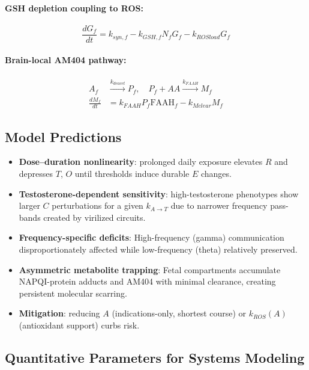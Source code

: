 \documentclass[11pt]{article}
\let\oldsubsection\subsection
\renewcommand{\subsection}[1]{\oldsubsection{#1}\setlength{\leftskip}{0.75em}}
\begin{document}
\paragraph{GSH depletion coupling to ROS:}
\begin{equation}
\frac{dG_f}{dt} = k_{syn,f} - k_{GSH,f} N_f G_f - k_{ROS load} G_f
\end{equation}

\paragraph{Brain-local AM404 pathway:}
\begin{align}
A_f &\xrightarrow{k_{deacet}} P_f, \quad P_f + AA \xrightarrow{k_{FAAH}} M_f \\
\frac{dM_f}{dt} &= k_{FAAH} P_f \text{FAAH}_f - k_{M clear} M_f
\end{align}

\subsection{Model Predictions}
\begin{itemize}
\item \textbf{Dose--duration nonlinearity}: prolonged daily exposure elevates $R$ and depresses $T$, $O$ until thresholds induce durable $E$ changes.
\item \textbf{Testosterone-dependent sensitivity}: high-testosterone phenotypes show larger $C$ perturbations for a given $k_{A \rightarrow T}$ due to narrower frequency pass-bands created by virilized circuits.
\item \textbf{Frequency-specific deficits}: High-frequency (gamma) communication disproportionately affected while low-frequency (theta) relatively preserved.
\item \textbf{Asymmetric metabolite trapping}: Fetal compartments accumulate NAPQI-protein adducts and AM404 with minimal clearance, creating persistent molecular scarring.
\item \textbf{Mitigation}: reducing $A$ (indications-only, shortest course) or $k_{ROS}(A)$ (antioxidant support) curbs risk.
\end{itemize}

\subsection{Quantitative Parameters for Systems Modeling}
\end{document}

